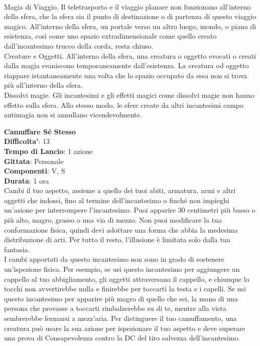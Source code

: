 \begin{multicols}{2}
\\Magia di Viaggio. Il teletrasporto e il viaggio planare non funzionano all’interno della sfera, che la sfera sia il punto di destinazione o di partenza di questo viaggio magico. All’interno della sfera, un portale verso un altro luogo, mondo, o piano di esistenza, così come uno spazio extradimensionale come quello creato dall’incantesimo trucco della corda, resta chiuso.
\\Creature e Oggetti. All’interno della sfera, una creatura o oggetto evocati o creati dalla magia svaniscono temporaneamente dall’esistenza. La creatura od oggetto riappare istantaneamente una volta che lo spazio occupato da essa non si trova più all’interno della sfera.
\\Dissolvi magie. Gli incantesimi e gli effetti magici come dissolvi magie non hanno effetto sulla sfera. Allo stesso modo, le sfere create da altri incantesimi campo antimagia non si annullano vicendevolmente. 

\medskip\textbf{Camuffare Sé Stesso}\\
\textbf{Difficolta'}: 13\\
\textbf{Tempo di Lancio}: 1 azione\\
\textbf{Gittata}: Personale\\
\textbf{Componenti}: V, S\\
\textbf{Durata}: 1 ora\\
Cambi il tuo aspetto, assieme a quello dei tuoi abiti, armatura, armi e altri oggetti che indossi, fino al termine dell’incantesimo o finché non impieghi un’azione per interrompere l’incantesimo. Puoi apparire 30 centimetri più basso o più alto, magro, grasso o una via di mezzo. Non puoi modificare la tua conformazione fisica, quindi devi adottare una forma che abbia la medesima distribuzione di arti. Per tutto il resto, l’illusione è limitata solo dalla tua fantasia.\\
I cambi apportati da questo incantesimo non sono in grado di sostenere un’ispezione fisica. Per esempio, se usi questo incantesimo per aggiungere un cappello al tuo abbigliamento, gli oggetti attraversano il cappello, e chiunque lo tocchi non avvertirebbe nulla e finirebbe per toccarti la testa e i capelli. Se usi questo incantesimo per apparire più magro di quello che sei, la mano di una persona che provasse a toccarti rimbalzerebbe su di te, mentre alla vista sembrerebbe fermarsi a mezz’aria. Per distinguere il tuo camuffamento, una creatura può usare la sua azione per ispezionare il tuo aspetto e deve superare una prova di Consapevolezza contro la DC del tiro salvezza dell’incantesimo. 


\end{multicols}
